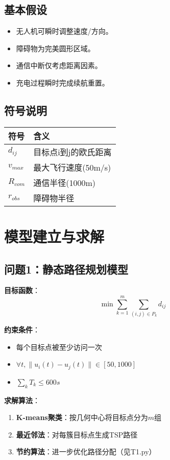\documentclass[12pt,fontset=adobe]{ctexart}
\begin{document}
\subsection{基本假设}
\begin{itemize}
  \item 无人机可瞬时调整速度/方向。
  \item 障碍物为完美圆形区域。
  \item 通信中断仅考虑距离因素。
  \item 充电过程瞬时完成续航重置。
\end{itemize}

\subsection{符号说明}
\begin{center}
  \begin{tabular}{ll}
    \hline
    符号 & 含义 \\
    \hline
    $d_{ij}$ & 目标点i到j的欧氏距离 \\
    $v_{max}$ & 最大飞行速度(50m/s) \\
    $R_{com}$ & 通信半径(1000m) \\
    $r_{obs}$ & 障碍物半径 \\
    \hline
  \end{tabular}
\end{center}

\section{模型建立与求解}

\subsection{问题1：静态路径规划模型}

\textbf{目标函数}：
\begin{equation}
  \min \sum_{k=1}^m \sum_{(i,j)\in P_k} d_{ij}
\end{equation}

\textbf{约束条件}：
\begin{itemize}
  \item 每个目标点被至少访问一次
  \item $\forall t, \|u_i(t)-u_j(t)\| \in [50,1000]$
  \item $\sum_{k} T_k \leq 600s$
\end{itemize}

\textbf{求解算法}：
\begin{enumerate}
  \item \textbf{K-means聚类}：按几何中心将目标点分为$m$组
  \item \textbf{最近邻法}：对每簇目标点生成TSP路径
  \item \textbf{节约算法}：进一步优化路径分配（见T1.py）
\end{enumerate}
\end{document}
